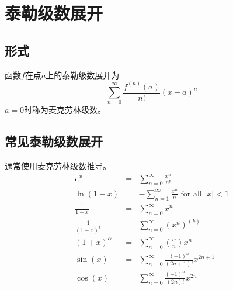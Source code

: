 \section{泰勒级数展开}
\subsection{形式}
函数$f$在点$a$上的泰勒级数展开为
\begin{displaymath}
    \sum_{n=0}^\infty{\frac{f^{(n)}(a)}{n!}(x-a)^n}
\end{displaymath}
$a=0$时称为麦克劳林级数。
\subsection{常见泰勒级数展开}
通常使用麦克劳林级数推导。
\begin{eqnarray*}
    e^x&=&\sum_{n=0}^\infty{\frac{x^n}{n!}}\\
    \ln(1-x)&=&-\sum_{n=1}^\infty{\frac{x^n}{n}} \textrm{~for all $|x|<1$}\\
    \frac{1}{1-x}&=&\sum_{n=0}^\infty{x^n}\\
    \frac{1}{(1-x)^k}&=&\sum_{n=0}^\infty{(x^n)^{(k)}}\\
    (1+x)^\alpha&=&\sum_{n=0}^\infty{{\alpha \choose n}x^n}\\
    \sin(x)&=&\sum_{n=0}^\infty{\frac{(-1)^n}{(2n+1)!}x^{2n+1}}\\
    \cos(x)&=&\sum_{n=0}^\infty{\frac{(-1)^n}{(2n)!}x^{2n}}\\
\end{eqnarray*}
